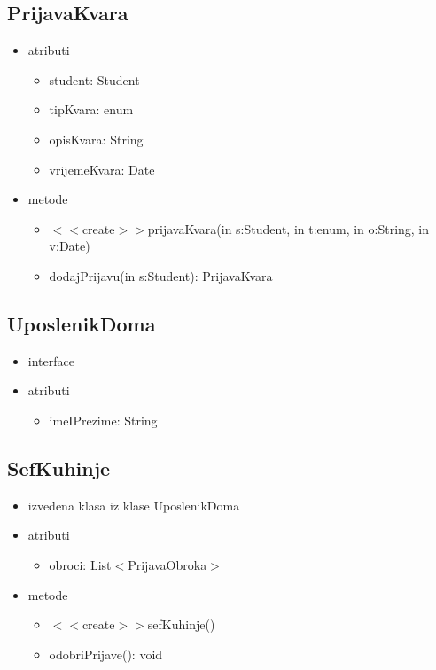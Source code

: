 \documentclass{article}
\begin{document}
\subsection*{PrijavaKvara}
\begin{itemize}
  \item atributi 
     \begin{itemize}
        \item student: Student
        \item tipKvara: enum
        \item opisKvara: String
        \item vrijemeKvara: Date

     \end{itemize}
  \item metode
  \begin{itemize}
        \item \(<<\)create\(>>\)prijavaKvara(in s:Student, in t:enum, in o:String, in v:Date)
        \item dodajPrijavu(in s:Student): PrijavaKvara
     \end{itemize}
\end{itemize}

\subsection*{UposlenikDoma}
 
\begin{itemize}
  \item interface
  \item atributi
     \begin{itemize}
        \item imeIPrezime: String
     \end{itemize}
\end{itemize}
 
\subsection*{SefKuhinje}
 
\begin{itemize}
  \item izvedena klasa iz klase UposlenikDoma
  \item atributi
     \begin{itemize}
        \item obroci: List\(<\)PrijavaObroka\(>\)
     \end{itemize}
  \item metode
  \begin{itemize}
        \item \(<<\)create\(>>\)sefKuhinje()
        \item odobriPrijave(): void
       
     \end{itemize}
 
\end{itemize}
 
\end{document}
